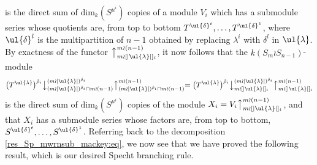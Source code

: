 is the direct sum of $\mathrm{dim}_k(S^{\mu^i})$ copies of a module $V_i$ which has a submodule series whose quotients are, from top to
bottom $T^{\ul{\delta}^t}, \ldots, T^{\ul{\delta}^1}$, where $\ul{\delta}^l$ is the multipartition of $n-1$ obtained by replacing $\lambda^i$
with $\delta^l$ in $\ul{\lambda}$. By exactness of the functor $\bigl\uparrow^{m \wr (n-1)}_{m \wr [|\ul{\lambda}|]_i}$, it now follows that the
$k(S_m \wr S_{n-1})$-module
\[
\bigl(T^{\ul{\lambda}}\bigr)^{\hat\rho_i}\bigl\downarrow^{(m{\wr}|\ul{\lambda}|)^{\hat\rho_i}}_{(m{\wr}|\ul{\lambda}|)^{\hat\rho_i} \cap m \wr (n-1)}
\bigl\uparrow^{m \wr (n-1)}_{(m{\wr}|\ul{\lambda}|)^{\hat\rho_i} \cap m \wr (n-1)}
=
\bigl(T^{\ul{\lambda}}\bigr)^{\hat\rho_i}\bigl\downarrow^{(m{\wr}|\ul{\lambda}|)^{\hat\rho_i}}_{m \wr [|\ul{\lambda}|]_i}
\bigl\uparrow^{m \wr (n-1)}_{m \wr [|\ul{\lambda}|]_i}
\]
is the direct sum of $\mathrm{dim}_k(S^{\mu^i})$ copies of the module $X_i = V_i\bigl\uparrow^{m \wr (n-1)}_{m \wr [|\ul{\lambda}|]_i}$, and that
$X_i$ has a submodule series whose factors are, from top to bottom, $S^{\ul{\delta}^t},\ldots,S^{\ul{\delta}^1}$.
Referring back to the decomposition \eqref{res_Sp_mwrnsub_mackey:eq}, we now see that we have proved the following result, which is our
desired Specht branching rule.
